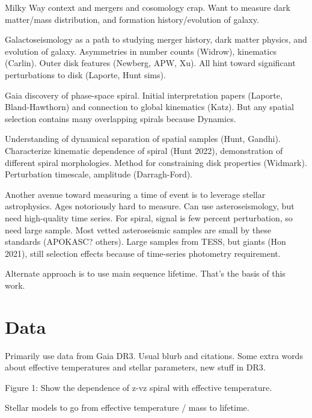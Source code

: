 Milky Way context and mergers and cosomology crap. Want to measure dark matter/mass distribution, and formation history/evolution of galaxy.

Galactoseismology as a path to studying merger history, dark matter physics, and evolution of galaxy. Asymmetries in number counts (Widrow), kinematics (Carlin). Outer disk features (Newberg, APW, Xu). All hint toward significant perturbations to disk (Laporte, Hunt sims).

Gaia discovery of phase-space spiral. Initial interpretation papers (Laporte, Bland-Hawthorn) and connection to global kinematics (Katz). But any spatial selection contains many overlapping spirals because Dynamics.

Understanding of dynamical separation of spatial samples (Hunt, Gandhi). Characterize kinematic dependence of spiral (Hunt 2022), demonstration of different spiral morphologies. Method for constraining disk properties (Widmark). Perturbation timescale, amplitude (Darragh-Ford).

Another avenue toward measuring a time of event is to leverage stellar astrophysics. Ages notoriously hard to measure. Can use asteroseismology, but need high-quality time series. For spiral, signal is few percent perturbation, so need large sample. Most vetted asteroseismic samples are small by these standards (APOKASC? others). Large samples from TESS, but giants (Hon 2021), still selection effects because of time-series photometry requirement.

Alternate approach is to use main sequence lifetime. That's the basis of this work.


\section{Data} \label{sec:data}

Primarily use data from Gaia DR3. Usual blurb and citations. Some extra words about effective temperatures and stellar parameters, new stuff in DR3.

Figure 1: Show the dependence of z-vz spiral with effective temperature.


Stellar models to go from effective temperature / mass to lifetime.

